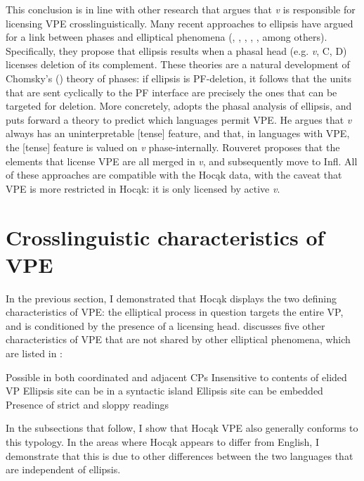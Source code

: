 \documentclass[output=paper]{LSP/langsci}
\begin{document}
This conclusion is in line with other research that argues that \emph{v} is responsible for licensing VPE crosslinguistically. Many recent approaches to ellipsis have argued for a link between phases and elliptical phenomena (\citealt{Holmberg2001}, \citealt{vanCraenenbroeck2004}, \citealt{Gengel2007},  \citealt{YoshidaGallego2008}, \citealt{Gallego2009}, among others). Specifically, they propose that ellipsis results when a phasal head (e.g. \emph{v}, C, D) licenses deletion of its complement. These theories are a natural development of Chomsky's (\citeyear{Chomsky2000,Chomsky2001b,Chomsky2004}) theory of phases: if ellipsis is PF-deletion, it follows that the units that are sent cyclically to the PF interface are precisely the ones that can be targeted for deletion. More concretely, \citet{Rouveret2012} adopts the phasal analysis of ellipsis, and puts forward a theory to predict which languages permit VPE. He argues that \emph{v} always has an uninterpretable [tense] feature, and that, in languages with VPE, the [tense] feature is valued on \emph{v} phase-internally. Rouveret proposes that the elements that license VPE are all merged in \emph{v}, and subsequently move to Infl. All of these approaches are compatible with the Hocąk data, with the caveat that VPE is more restricted in Hocąk: it is only licensed by active \emph{v}.


\section{Crosslinguistic characteristics of VPE}\label{sec:johnson:3}

In the previous section, I demonstrated that Hocąk displays the two defining characteristics of VPE: the elliptical process in question targets the entire VP, and is conditioned by the presence of a licensing head. \citet{Goldberg2005} discusses five other characteristics of VPE that are not shared by other elliptical phenomena, which are listed in : 
 
\ea\label{ex:johnson:24}
\ea 
Possible in both coordinated and adjacent CPs
\ex 
Insensitive to contents of elided VP
\ex 
Ellipsis site can be in a syntactic island
\ex 
Ellipsis site can be embedded
\ex 
Presence of strict and sloppy readings
\z
\z


In the subsections that follow, I show that Hocąk VPE also generally conforms to this typology. In the areas where Hocąk appears to differ from English, I demonstrate that this is due to other differences between the two languages that are independent of ellipsis.
\end{document}
